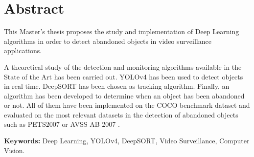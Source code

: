 
\chapter*{Abstract}
\label{cha:abstract}

\noindent
This Master's thesis proposes the study and implementation of Deep Learning algorithms in order to detect abandoned objects in video surveillance applications.

A theoretical study of the detection and monitoring algorithms available in the State of the Art has been carried out. YOLOv4 \cite{bochkovskiy2020yolov4} has been used to detect objects in real time. DeepSORT \cite{Wojke2017simple} has been chosen as tracking algorithm. Finally, an algorithm has been developed to determine when an object has been abandoned or not. All of them have been implemented on the COCO benchmark dataset \cite{lin2015microsoft} and evaluated on the most relevant datasets in the detection of abandoned objects such as PETS2007 \cite{pets2007-dataset} or AVSS AB 2007 \cite{AVSSAB2007-dataset}.

\textbf{Keywords:} Deep Learning, YOLOv4, DeepSORT, Video Surveillance, Computer Vision.